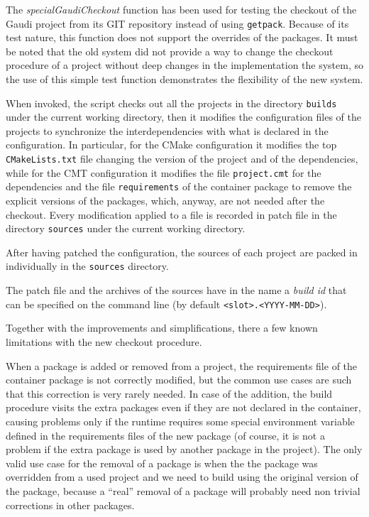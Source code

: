 \documentclass{lhcbnote}
\begin{document}
The \emph{specialGaudiCheckout} function has been used for testing the checkout
of the Gaudi project from its GIT repository instead of using \texttt{getpack}.
Because of its test nature, this function does not support the overrides of the
packages.  It must be noted that the old system did not provide a way to change
the checkout procedure of a project without deep changes in the implementation
the system, so the use of this simple test function demonstrates the flexibility
of the new system.

When invoked, the script checks out all the projects in the directory
\texttt{builds} under the current working directory, then it modifies the
configuration files of the projects to synchronize the interdependencies with
what is declared in the configuration.  In particular, for the CMake
configuration it modifies the top \texttt{CMakeLists.txt} file changing the
version of the project and of the dependencies, while for the CMT configuration
it modifies the file \texttt{project.cmt} for the dependencies and the file
\texttt{requirements} of the container package to remove the explicit versions
of the packages, which, anyway, are not needed after the checkout.  Every
modification applied to a file is recorded in patch file in the directory
\texttt{sources} under the current working directory.

After having patched the configuration, the sources of each project are packed
in individually in the \texttt{sources} directory.

The patch file and the archives of the sources have in the name a \emph{build
id} that can be specified on the command line (by default
\texttt{<slot>.<YYYY-MM-DD>}).

Together with the improvements and simplifications, there a few known
limitations with the new checkout procedure.

When a package is added or removed from a project, the requirements file of the
container package is not correctly modified, but the common use cases are such
that this correction is very rarely needed.  In case of the addition, the build
procedure visits the extra packages even if they are not declared in the
container, causing problems only if the runtime requires some special
environment variable defined in the requirements files of the new package (of
course, it is not a problem if the extra package is used by another package in
the project).  The only valid use case for the removal of a package is when the
the package was overridden from a used project and we need to build using the
original version of the package, because a ``real'' removal of a package will
probably need non trivial corrections in other packages.
\end{document}
